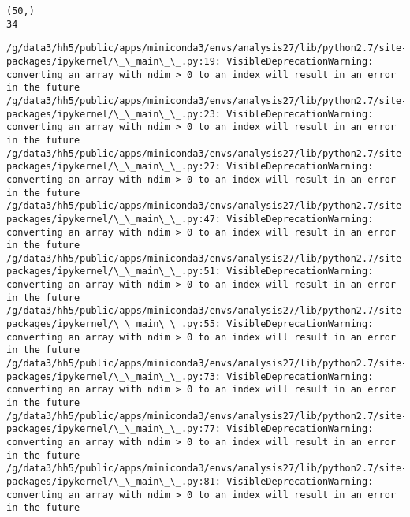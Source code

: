 \documentclass[11pt]{article}
\begin{document}
    \begin{Verbatim}[commandchars=\\\{\}]
(50,)
34

    \end{Verbatim}

    \begin{Verbatim}[commandchars=\\\{\}]
/g/data3/hh5/public/apps/miniconda3/envs/analysis27/lib/python2.7/site-packages/ipykernel/\_\_main\_\_.py:19: VisibleDeprecationWarning: converting an array with ndim > 0 to an index will result in an error in the future
/g/data3/hh5/public/apps/miniconda3/envs/analysis27/lib/python2.7/site-packages/ipykernel/\_\_main\_\_.py:23: VisibleDeprecationWarning: converting an array with ndim > 0 to an index will result in an error in the future
/g/data3/hh5/public/apps/miniconda3/envs/analysis27/lib/python2.7/site-packages/ipykernel/\_\_main\_\_.py:27: VisibleDeprecationWarning: converting an array with ndim > 0 to an index will result in an error in the future
/g/data3/hh5/public/apps/miniconda3/envs/analysis27/lib/python2.7/site-packages/ipykernel/\_\_main\_\_.py:47: VisibleDeprecationWarning: converting an array with ndim > 0 to an index will result in an error in the future
/g/data3/hh5/public/apps/miniconda3/envs/analysis27/lib/python2.7/site-packages/ipykernel/\_\_main\_\_.py:51: VisibleDeprecationWarning: converting an array with ndim > 0 to an index will result in an error in the future
/g/data3/hh5/public/apps/miniconda3/envs/analysis27/lib/python2.7/site-packages/ipykernel/\_\_main\_\_.py:55: VisibleDeprecationWarning: converting an array with ndim > 0 to an index will result in an error in the future
/g/data3/hh5/public/apps/miniconda3/envs/analysis27/lib/python2.7/site-packages/ipykernel/\_\_main\_\_.py:73: VisibleDeprecationWarning: converting an array with ndim > 0 to an index will result in an error in the future
/g/data3/hh5/public/apps/miniconda3/envs/analysis27/lib/python2.7/site-packages/ipykernel/\_\_main\_\_.py:77: VisibleDeprecationWarning: converting an array with ndim > 0 to an index will result in an error in the future
/g/data3/hh5/public/apps/miniconda3/envs/analysis27/lib/python2.7/site-packages/ipykernel/\_\_main\_\_.py:81: VisibleDeprecationWarning: converting an array with ndim > 0 to an index will result in an error in the future

    \end{Verbatim}

    \begin{center}
    \end{center}
    { \hspace*{\fill} \\}
    
\end{document}
